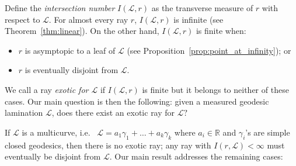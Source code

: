 \documentclass[11pt]{article} %
\theoremstyle{plain}
\theoremstyle{definition}
\numberwithin{equation}{section}
\begin{document}
Define the \emph{intersection number} $I({\mathcal{L}},r)$ as the transverse measure of $r$ with respect to $\mathcal{L}$. For almost every ray $r$, $I({\mathcal{L}},r)$ is infinite (see Theorem~\ref{thm:linear}). On the other hand, $I({\mathcal{L}},r)$ is finite when:


\begin{itemize}[topsep=0mm, itemsep=0mm]
    \item $r$ is asymptopic to a leaf of $\mathcal{L}$ (see Proposition~\ref{prop:point_at_infinity}); or
    \item $r$ is eventually disjoint from $\mathcal{L}$.
\end{itemize}
We call a ray \emph{exotic for $\mathcal{L}$} if $I(\mathcal{L},r)$ is finite but it belongs to neither of these cases. Our main question is then the following: given a measured geodesic lamination $\mathcal{L}$, does there exist an exotic ray for $\mathcal{L}?$


If $\mathcal{L}$ is a multicurve, i.e.~
$
\mathcal{L}=a_1\gamma_1+\dots+a_k\gamma_k
$
where $a_i \in \mathbb{R}$ and $\gamma_i$'s are simple closed geodesics, then there is no exotic ray; any ray with $I(r,\mathcal{L})<\infty$ must eventually be disjoint from $\mathcal{L}$. Our main result addresses the remaining cases: 
\end{document}
